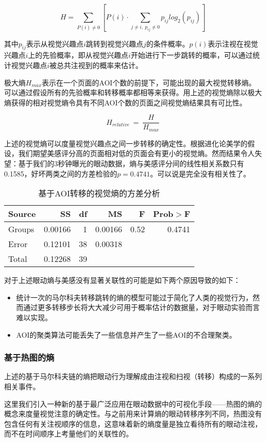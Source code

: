 \documentclass[master, fontset=mac, openany, oneside, zihao=-4]{sjtuthesis}
\begin{document}
$$H = \sum_{P(i)\neq0}[P(i)\cdot \sum_{j\neq i,~p_{ij}\neq0} p_{ij}log_2(p_{ij})]$$

其中$p_{ij}$表示从视觉兴趣点$i$跳转到视觉兴趣点$j$的条件概率。$p(i)$表示注视在视觉兴趣点$i$上的先验概率，即从视觉兴趣点$i$开始进行下一步跳转的概率，可以通过统计视觉兴趣点$i$被总共注视到的概率来估计。

极大熵$H_{max}$表示在一个页面的AOI个数的前提下，可能出现的最大视觉转移熵。可以通过假设所有的先验概率和转移概率都相等来获得。用上述的视觉熵除以极大熵获得的相对视觉熵令具有不同AOI个数的页面之间视觉熵结果具有可比性。

$$H_{relative}~=~\frac{H}{H_{max}}$$

上述的视觉熵可以度量视觉兴趣点之间一步转移的确定性。根据进化论美学的假设，我们期望美感评分高的页面相对低的页面会有更小的视觉熵。然而结果令人失望：基于我们的3秒钟曝光的眼动数据，熵与美感评分间的线性相关系数只有0.1585，好坏两类之间的方差检验的$p=0.4741$。可以说是完全没有相关性了。

\begin{table}[H]
\centering
\begin{tabular}{lrrrrr}
  \hline
  Source&SS&df&MS&F&Prob$>$F\\ \hline
  Groups&0.00166&1&0.00166&0.52&0.4741\\
  Error&0.12101&38&0.00318&&\\
  Total&0.12268&39&&&\\
  \hline
\end{tabular}
\caption{基于AOI转移的视觉熵的方差分析}
\label{tab:ANOVA-ve}
\end{table}

对于上述眼动熵与美感没有显著关联性的可能是如下两个原因导致的如下：

\begin{itemize}
  \item 统计一次的马尔科夫转移跳转的熵的模型可能过于简化了人类的视觉行为，然而通过更多转移步长将大大减少可用于概率估计的数据量，对于眼动实验而言难以实现。
  \item AOI的聚类算法可能丢失了一些信息并产生了一些AOI的不合理聚类。
\end{itemize}

\subsubsection{基于热图的熵}
上述的基于马尔科夫链的熵把眼动行为理解成由注视和扫视（转移）构成的一系列相关事件。

这里我们引入一种新的基于最广泛应用在眼动数据中的可视化手段——热图\cite{Nielsen2010}的熵的概念来度量视觉注意的确定性。与之前用来计算熵的眼动转移序列不同，热图没有包含任何有关注视顺序的信息，这意味着新的熵度量是独立看待所有的眼动注视，而不在时间顺序上考量他们的关联性的。
\end{document}
